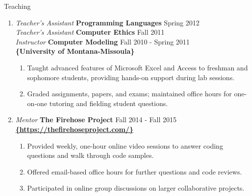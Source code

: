 \documentclass[oneside]{article}%
\begin{document}
\huge{Teaching}
\small
\begin{enumerate}[]
	\item \textit{Teacher's Assistant} \textbf{Programming Languages} \hfill Spring 2012\\
		\textit{Teacher's Assistant} \textbf{Computer Ethics} \hfill Fall 2011\\
		\textit{Instructor} \textbf{Computer Modeling} \hfill Fall 2010 - Spring 2011\\
		\textbf{\{University of Montana-Missoula\}}
		\begin{enumerate}[-]
			\item Taught advanced features of Microsoft Excel and Access to freshman and sophomore students, providing hands-on support during lab sessions.
			\item Graded assignments, papers, and exams; maintained office hours for one-on-one tutoring and fielding student questions.
		\end{enumerate}
	\item \textit{Mentor} \textbf{The Firehose Project} \hfill Fall 2014 - Fall 2015\\
		\textbf{\href{https://thefirehoseproject.com/}{\{https://thefirehoseproject.com/\}}}
		\begin{enumerate}[-]
			\item Provided weekly, one-hour online video sessions to answer coding questions and walk through code samples.
			\item Offered email-based office hours for further questions and code reviews.
			\item Participated in online group discussions on larger collaborative projects.
		\end{enumerate}
\end{enumerate}
\
\noindent
\end{document}
